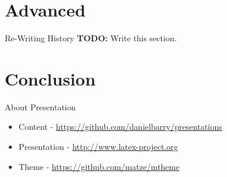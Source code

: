 \documentclass{beamer}
\begin{document}
  \section{Advanced}
  \begin{frame}{Re-Writing History}
    \textbf{TODO:} Write this section.
  \end{frame}
  \section{Conclusion}
  \begin{frame}{About Presentation}
    \begin{itemize}
      \item Content - \url{https://github.com/danielbarry/presentations}
      \item Presentation - \url{http://www.latex-project.org}
      \item Theme - \url{https://github.com/matze/mtheme}
    \end{itemize}
  \end{frame}
\end{document}

